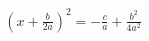 \documentclass[preview]{standalone}
\begin{document}
\begin{align*}
(x + \frac{b}{2a})^2 = -\frac{c}{a} + \frac{b^2}{4a^2}
\end{align*}
\end{document}

